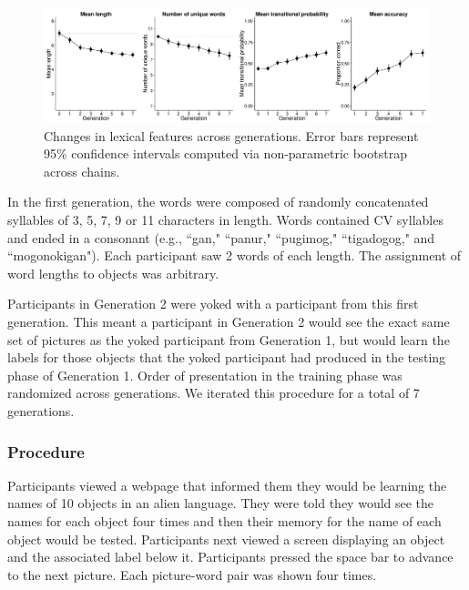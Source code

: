 \begin{figure}[t]
\begin{center}
\includegraphics[scale = .3]{figs/Plot1.pdf}
\end{center}
\vspace{-.5em}
\caption{Changes in lexical features across generations. Error bars represent 95\% confidence intervals computed via non-parametric bootstrap across chains.}
\label{fig:length}
\vspace{-1em}
\end{figure}

In the first generation, the words were composed of randomly concatenated syllables of 3, 5, 7, 9 or 11 characters in length. Words contained CV syllables and ended in a consonant (e.g., ``gan," ``panur," ``pugimog," ``tigadogog," and ``mogonokigan"). Each participant saw 2 words of each length. The assignment of word lengths to objects was arbitrary.

Participants in Generation 2 were yoked with a participant from this first generation. This meant a participant in Generation 2 would see the exact same set of pictures as the yoked participant from Generation 1, but would learn the labels for those objects that the yoked participant had produced in the testing phase of Generation 1. Order of presentation in the training phase was randomized across generations. We iterated this procedure for a total of 7 generations.

\subsubsection{Procedure} 


Participants viewed a webpage that informed them they would be learning the names of 10 objects in an alien language. They were told they would see the names for each object four times and then their memory for the name of each object would be tested. Participants next viewed a screen displaying an object and the associated label below it. Participants pressed the space bar to advance to the next picture. Each picture-word pair was shown four times. 


